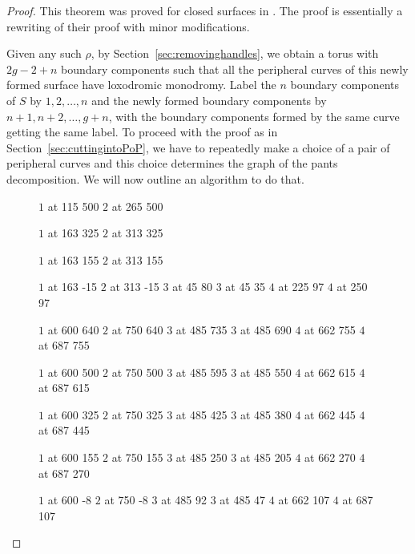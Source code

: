 \begin{proof}
	This theorem was proved for closed surfaces in \cite{LeFils}. The proof is essentially a rewriting of their proof with minor modifications.
	
	Given any such $\rho$, by Section~\ref{sec:removinghandles}, we obtain a torus with $2g-2+n$ boundary components such that all the peripheral curves of this newly formed surface have loxodromic monodromy. Label the $n$ boundary components of $S$ by $1,2,\ldots,n$ and the newly formed boundary components by $n+1, n+2, \ldots, g+n$, with the boundary components formed by the same curve getting the same label. To proceed with the proof as in Section~\ref{sec:cuttingintoPoP}, we have to repeatedly make a choice of a pair of peripheral curves and this choice determines the graph of the pants decomposition. We will now outline an algorithm to do that.
	
	\begin{figure}[h]
			\pinlabel $1$ at 115 500
			\pinlabel $2$ at 265 500
			
			\pinlabel $1$ at 163 325
			\pinlabel $2$ at 313 325
			
			\pinlabel $1$ at 163 155
			\pinlabel $2$ at 313 155
			
			\pinlabel $1$ at 163 -15
			\pinlabel $2$ at 313 -15
			\pinlabel $3$ at 45 80
			\pinlabel $3$ at 45 35
			\pinlabel $4$ at 225 97
			\pinlabel $4$ at 250 97
			
			\pinlabel $1$ at 600 640
			\pinlabel $2$ at 750 640
			\pinlabel $3$ at 485 735
			\pinlabel $3$ at 485 690
			\pinlabel $4$ at 662 755
			\pinlabel $4$ at 687 755
			
			\pinlabel $1$ at 600 500
			\pinlabel $2$ at 750 500
			\pinlabel $3$ at 485 595
			\pinlabel $3$ at 485 550
			\pinlabel $4$ at 662 615
			\pinlabel $4$ at 687 615
			
			\pinlabel $1$ at 600 325
			\pinlabel $2$ at 750 325
			\pinlabel $3$ at 485 425
			\pinlabel $3$ at 485 380
			\pinlabel $4$ at 662 445
			\pinlabel $4$ at 687 445
			
			\pinlabel $1$ at 600 155
			\pinlabel $2$ at 750 155
			\pinlabel $3$ at 485 250
			\pinlabel $3$ at 485 205
			\pinlabel $4$ at 662 270
			\pinlabel $4$ at 687 270
			
			\pinlabel $1$ at 600 -8
			\pinlabel $2$ at 750 -8
			\pinlabel $3$ at 485 92
			\pinlabel $3$ at 485 47
			\pinlabel $4$ at 662 107
			\pinlabel $4$ at 687 107
		

\end{figure}
\end{proof}
